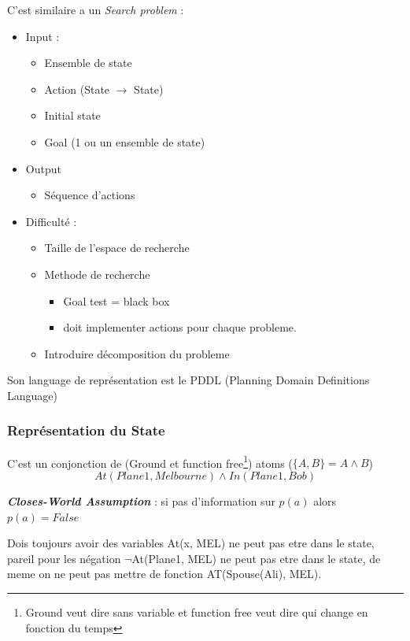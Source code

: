 		C'est similaire a un \textit{Search problem} :
		\begin{itemize}
			\item Input :
			\begin{itemize}
				\item Ensemble de state
				\item Action (State $\rightarrow$ State)
				\item Initial state
				\item Goal (1 ou un ensemble de state)
			\end{itemize}
			\item Output
				\begin{itemize}
					\item Séquence d'actions
				\end{itemize}
				
			\item Difficulté : 
				\begin{itemize}
					\item Taille de l'espace de recherche
					\item Methode de recherche
					\begin{itemize}
						\item Goal test = black box
						\item doit implementer actions pour chaque probleme.
					\end{itemize}
					\item Introduire décomposition du probleme
				\end{itemize}
		\end{itemize}
		
		Son language de représentation est le PDDL (Planning Domain Definitions Language)
		
		\subsubsection{Représentation du State}
			C'est un conjonction de (Ground et function free\footnote{Ground veut dire sans variable et function free veut dire qui change en fonction du temps}) atoms ($\{A,B\} = A\land B$)
			\begin{equation}
				At(Plane1, Melbourne) \land In(Plane1, Bob)
			\end{equation}
			
			\textbf{\textit{Closes-World Assumption}} : si pas d'information sur $p(a)$ alors $p(a) = False$
			
			Dois toujours avoir des variables At(x, MEL) ne peut pas etre dans le state, pareil pour les négation $\neg$At(Plane1, MEL) ne peut pas etre dans le state, de meme on ne peut pas mettre de fonction AT(Spouse(Ali), MEL).
			
